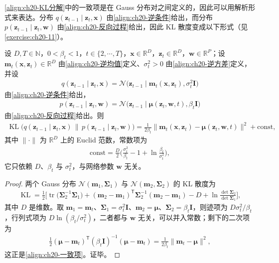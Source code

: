 \documentclass[../../main.tex]{subfiles}
\begin{document}
\eqref{align:ch20-KL分解}中的一致项是在 Gauss 分布对之间定义的，因此可以用解析形式来表达。分布 $q(\bm{z}_{t-1}\mid\bm{z}_t,\bm{x})$ 由\eqref{align:ch20-逆条件}给出，而分布 $p(\bm{z}_{t-1}\mid\bm{z}_t,\bm{w})$ 由\eqref{align:ch20-反向过程}给出，因此 KL 散度变成以下形式（见\cref{exercise:ch20-11}）。

\begin{proposition}[一致项的闭式表达]\label{proposition:ch20-一致项KL}
设 $D,T\in\mathbb{N}$，$0<\beta_t<1$，$t\in\{2,\cdots,T\}$，$\bm{x}\in\mathbb{R}^{D}$，$\bm{z}_t\in\mathbb{R}^{D}$，$\bm{w}\in\mathbb{R}^{P}$；设 $\bm{m}_t(\bm{x},\bm{z}_t)\in\mathbb{R}^{D}$ 由\eqref{align:ch20-逆均值}定义、$\sigma_t^{2}>0$ 由\eqref{align:ch20-逆方差}定义，并设
\begin{align*}
q(\bm{z}_{t-1}\mid\bm{z}_t,\bm{x})=\mathcal{N}\big(\bm{z}_{t-1}\mid\bm{m}_t(\bm{x},\bm{z}_t),\sigma_t^2\bm{I}\big)
\end{align*}
由\eqref{align:ch20-逆条件}给出，
\begin{align*}
p(\bm{z}_{t-1}\mid\bm{z}_t,\bm{w})=\mathcal{N}\big(\bm{z}_{t-1}\mid\bm{\mu}(\bm{z}_t,\bm{w},t),\beta_t\bm{I}\big)
\end{align*}
由\eqref{align:ch20-反向过程}给出。则
\begin{align}
\operatorname{KL}\big(q(\bm{z}_{t-1}\mid\bm{z}_t,\bm{x})\,\|\,p(\bm{z}_{t-1}\mid\bm{z}_t,\bm{w})\big)=\frac{1}{2\beta_t}\big\|\bm{m}_t(\bm{x},\bm{z}_t)-\bm{\mu}(\bm{z}_t,\bm{w},t)\big\|^2+\mathrm{const},
\label{align:ch20-一致项}
\end{align}
其中 $\|\cdot\|$ 为 $\mathbb{R}^{D}$ 上的 Euclid 范数，常数项为
\begin{align*}
\mathrm{const}=\frac{D}{2}\Big(\frac{\sigma_t^{2}}{\beta_t}-1+\ln\frac{\beta_t}{\sigma_t^{2}}\Big),
\end{align*}
它只依赖 $D$、$\beta_t$ 与 $\sigma_t^{2}$，与网络参数 $\bm{w}$ 无关。
\end{proposition}

\begin{proof}
两个 Gauss 分布 $\mathcal{N}(\bm{m}_1,\bm{\Sigma}_1)$ 与 $\mathcal{N}(\bm{m}_2,\bm{\Sigma}_2)$ 的 KL 散度为
\begin{align*}
\operatorname{KL}=\frac{1}{2}\Big[\operatorname{tr}\big(\bm{\Sigma}_2^{-1}\bm{\Sigma}_1\big)+(\bm{m}_2-\bm{m}_1)^{\mathsf T}\bm{\Sigma}_2^{-1}(\bm{m}_2-\bm{m}_1)-D+\ln\frac{\det\bm{\Sigma}_2}{\det\bm{\Sigma}_1}\Big],
\end{align*}
其中 $D$ 是维数。取 $\bm{m}_1=\bm{m}_t$、$\bm{\Sigma}_1=\sigma_t^2\bm{I}$、$\bm{m}_2=\bm{\mu}$、$\bm{\Sigma}_2=\beta_t\bm{I}$，则迹项为 $D\sigma_t^2/\beta_t$，行列式项为 $D\ln(\beta_t/\sigma_t^2)$，二者都与 $\bm{w}$ 无关，可以并入常数；剩下的二次项为
\begin{align*}
\frac{1}{2}(\bm{\mu}-\bm{m}_t)^{\mathsf T}(\beta_t\bm{I})^{-1}(\bm{\mu}-\bm{m}_t)=\frac{1}{2\beta_t}\|\bm{m}_t-\bm{\mu}\|^2,
\end{align*}
这正是\eqref{align:ch20-一致项}。证毕。
\end{proof}
\end{document}
